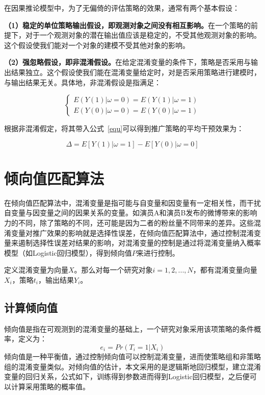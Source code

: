 在因果推论模型中，为了无偏倚的评估策略的效果，通常有两个基本假设：

\textbf{（1）稳定的单位策略输出假设，即观测对象之间没有相互影响。}在一个策略的前提下，对于一个观测对象的潜在输出值应该是稳定的，不受其他观测对象的影响。这个假设使我们能对一个对象的建模不受其他对象的影响。

\textbf{（2）强忽略假设，即非混淆假设。}在给定混淆变量的条件下，策略是否采用与输出结果独立。这个假设使我们能在混淆变量给定时，对是否采用策略进行建模时，与输出结果无关。具体地，非混淆假设是指满足：

\begin{equation}
\begin{cases}
E(Y(1)|\omega=0)=E(Y(1)|\omega=1)\\
E(Y(0)|\omega=0)=E(Y(0)|\omega=1)
\end{cases}
\end{equation}

根据非混淆假定，将其带入公式~\ref{equ}可以得到推广策略的平均干预效果为：

\begin{equation}
\Delta=E[Y(1)|\omega=1]-E[Y(0)|\omega=0]
\end{equation}

\section{倾向值匹配算法}

在倾向值匹配算法中，混淆变量是指可能与自变量和因变量有一定相关性，而干扰自变量与因变量之间的因果关系的变量。如演员A和演员B发布的微博带来的影响力的不同，除了策略的不同，还可能是因为二者的粉丝量不同带来的差异。这些混淆变量对推广效果的影响就是选择性误差，在倾向值匹配算法中，通过控制混淆变量来遏制选择性误差对结果的影响，对混淆变量的控制是通过将混淆变量纳入概率模型（如Logistic回归模型），得到倾向值$P$来进行控制。

定义混淆变量为向量$X$。那么对每一个研究对象$i=1,2, ...,N$，都有混淆变量向量$X_i$，策略$t_i$，输出结果$Y_i$。

\subsection{计算倾向值}

倾向值是指在可观测到的混淆变量的基础上，一个研究对象采用该项策略的条件概率，定义为：
\begin{equation}
e_i = Pr(T_i = 1 | X_i)
\end{equation}
倾向值是一种平衡值，通过控制倾向值可以控制混淆变量，进而使策略组和非策略组的混淆变量类似。对倾向值的估计，本文采用的是逻辑斯地回归模型，建立混淆变量的回归关系，公式如下，训练得到参数进而得到Logistic回归模型，之后便可以计算采用策略的概率值。

